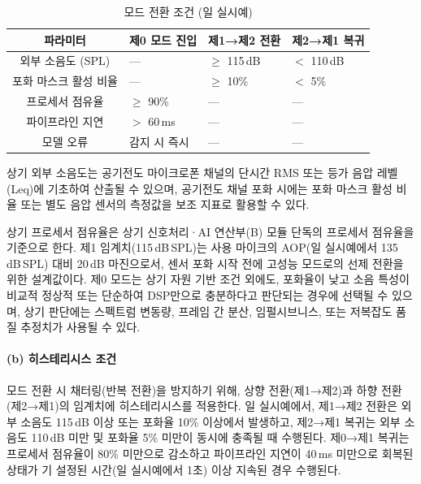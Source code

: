 \documentclass{article}
\begin{document}
\begin{table}[H]
    \centering
    \renewcommand{\arraystretch}{1.3}
    \begin{tabular}{c|l|l|l}
        \hline
        \textbf{파라미터} & \textbf{제0 모드 진입} & \textbf{제1→제2 전환} & \textbf{제2→제1 복귀} \\
        \hline\hline
        외부 소음도 (SPL) & — & $\geq$ 115\,dB & $<$ 110\,dB \\
        \hline
        포화 마스크 활성 비율 & — & $\geq$ 10\% & $<$ 5\% \\
        \hline
        프로세서 점유율 & $\geq$ 90\% & — & — \\
        \hline
        파이프라인 지연 & $>$ 60\,ms & — & — \\
        \hline
        모델 오류 & 감지 시 즉시 & — & — \\
        \hline
    \end{tabular}
    \caption{모드 전환 조건 (일 실시예)}
\end{table}

상기 외부 소음도는 공기전도 마이크로폰 채널의 단시간 RMS 또는 등가 음압 레벨(Leq)에 기초하여 산출될 수 있으며, 공기전도 채널 포화 시에는 포화 마스크 활성 비율 또는 별도 음압 센서의 측정값을 보조 지표로 활용할 수 있다.

상기 프로세서 점유율은 상기 신호처리·AI 연산부(B) 모듈 단독의 프로세서 점유율을 기준으로 한다. 제1 임계치(115\,dB\,SPL)는 사용 마이크의 AOP(일 실시예에서 135\,dB\,SPL) 대비 20\,dB 마진으로서, 센서 포화 시작 전에 고성능 모드로의 선제 전환을 위한 설계값이다. 제0 모드는 상기 자원 기반 조건 외에도, 포화율이 낮고 소음 특성이 비교적 정상적 또는 단순하여 DSP만으로 충분하다고 판단되는 경우에 선택될 수 있으며, 상기 판단에는 스펙트럼 변동량, 프레임 간 분산, 임펄시브니스, 또는 저복잡도 품질 추정치가 사용될 수 있다.

\paragraph{(b) 히스테리시스 조건}

모드 전환 시 채터링(반복 전환)을 방지하기 위해, 상향 전환(제1→제2)과 하향 전환(제2→제1)의 임계치에 히스테리시스를 적용한다. 일 실시예에서, 제1→제2 전환은 외부 소음도 115\,dB 이상 또는 포화율 10\% 이상에서 발생하고, 제2→제1 복귀는 외부 소음도 110\,dB 미만 및 포화율 5\% 미만이 동시에 충족될 때 수행된다. 제0→제1 복귀는 프로세서 점유율이 80\% 미만으로 감소하고 파이프라인 지연이 40\,ms 미만으로 회복된 상태가 기 설정된 시간(일 실시예에서 1초) 이상 지속된 경우 수행된다.
\end{document}
